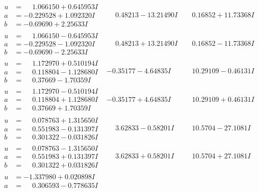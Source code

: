 \documentclass[1p]{elsarticle_modified}
\theoremstyle{definition}
\begin{document}
$$\begin{array}{c|c|c}
\begin{aligned}
u &= \phantom{-}1.066150 + 0.645953 I \\
a &= -0.229528 + 1.092320 I \\
b &= -0.69690 + 2.25633 I\end{aligned}
 & \phantom{-}0.48213 - 13.21490 I & \phantom{-}0.16852 + 11.73368 I \\ \hline\begin{aligned}
u &= \phantom{-}1.066150 - 0.645953 I \\
a &= -0.229528 - 1.092320 I \\
b &= -0.69690 - 2.25633 I\end{aligned}
 & \phantom{-}0.48213 + 13.21490 I & \phantom{-}0.16852 - 11.73368 I \\ \hline\begin{aligned}
u &= \phantom{-}1.172970 + 0.510194 I \\
a &= \phantom{-}0.118804 - 1.128680 I \\
b &= \phantom{-}0.37669 - 1.70359 I\end{aligned}
 & -0.35177 - 4.64835 I & \phantom{-}10.29109 - 0.46131 I \\ \hline\begin{aligned}
u &= \phantom{-}1.172970 - 0.510194 I \\
a &= \phantom{-}0.118804 + 1.128680 I \\
b &= \phantom{-}0.37669 + 1.70359 I\end{aligned}
 & -0.35177 + 4.64835 I & \phantom{-}10.29109 + 0.46131 I \\ \hline\begin{aligned}
u &= \phantom{-}0.078763 + 1.315650 I \\
a &= \phantom{-}0.551983 - 0.131397 I \\
b &= \phantom{-}0.301322 - 0.031826 I\end{aligned}
 & \phantom{-}3.62833 - 0.58201 I & \phantom{-}10.5704 - 27.1081 I \\ \hline\begin{aligned}
u &= \phantom{-}0.078763 - 1.315650 I \\
a &= \phantom{-}0.551983 + 0.131397 I \\
b &= \phantom{-}0.301322 + 0.031826 I\end{aligned}
 & \phantom{-}3.62833 + 0.58201 I & \phantom{-}10.5704 + 27.1081 I \\ \hline\begin{aligned}
u &= -1.337980 + 0.020898 I \\
a &= \phantom{-}0.306593 - 0.778635 I \\

\end{aligned}
\end{array}$$
\end{document}
